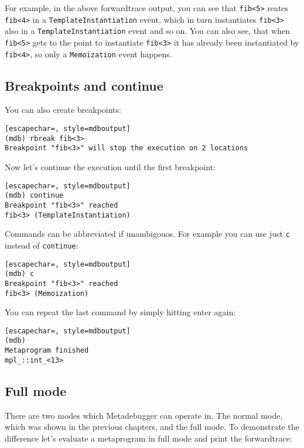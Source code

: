 For example, in the above forwardtrace output, you can see that \texttt{fib<5>}
reates \texttt{fib<4>} in a \texttt{TemplateInstantiation} event, which in turn
instantiates \texttt{fib<3>} also in a \texttt{TemplateInstantiation} event and
so on.  You can also see, that when \texttt{fib<5>} gets to the point to
instantiate \texttt{fib<3>} it has already been instantiated by
\texttt{fib<4>}, so only a \texttt{Memoization} event happens.

\subsection{Breakpoints and continue}

You can also create breakpoints:

\begin{lstlisting}[escapechar=, style=mdboutput]
(mdb) rbreak fib<3>
Breakpoint "fib<3>" will stop the execution on 2 locations
\end{lstlisting}

Now let's continue the execution until the first breakpoint:

\begin{lstlisting}[escapechar=, style=mdboutput]
(mdb) continue
Breakpoint "fib<3>" reached
fib<3> (TemplateInstantiation)
\end{lstlisting}

Commands can be abbreviated if unambigouos. For example you can use just
\texttt{c} instead of \texttt{continue}:

\begin{lstlisting}[escapechar=, style=mdboutput]
(mdb) c
Breakpoint "fib<3>" reached
fib<3> (Memoization)
\end{lstlisting}

You can repeat the last command by simply hitting enter again:

\begin{lstlisting}[escapechar=, style=mdboutput]
(mdb)
Metaprogram finished
mpl_::int_<13>
\end{lstlisting}


\subsection{Full mode}

There are two modes which Metadebugger can operate in. The normal mode, which
was shown in the previous chapters, and the full mode. To demonstrate the
difference let's evaluate a metaprogram in full mode and print the
forwardtrace:

